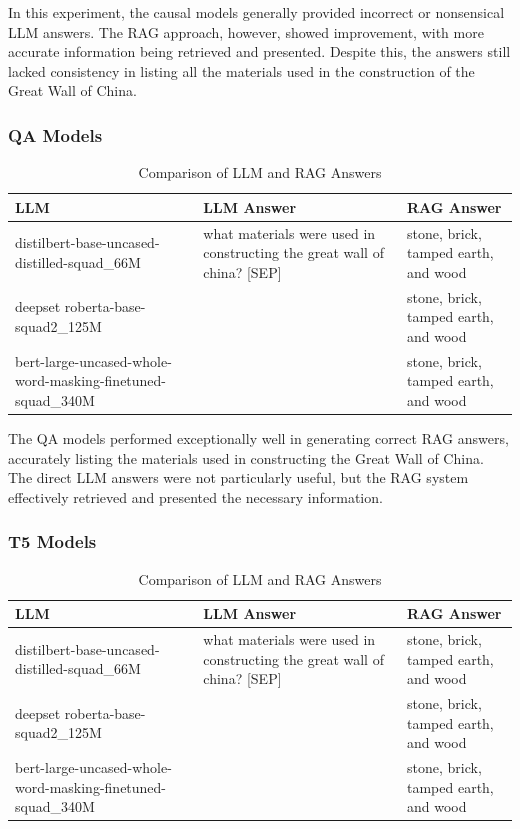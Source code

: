 \documentclass{wseas}
\begin{document}
In this experiment, the causal models generally provided incorrect or
nonsensical LLM answers. The RAG approach, however, showed improvement,
with more accurate information being retrieved and presented. Despite
this, the answers still lacked consistency in listing all the materials
used in the construction of the Great Wall of China.

\subsubsection{QA Models}

\begin{table}[htbp]
\centering
\caption{Comparison of LLM and RAG Answers} %
\begin{tabular}{p{0.3714\linewidth} p{0.4000\linewidth} p{0.2286\linewidth}}
\toprule
\textbf{LLM} & \textbf{LLM Answer} & \textbf{RAG Answer} \\
\midrule
distilbert-base-uncased-distilled-squad\_66M & what materials were used in constructing the great wall of china? {[}SEP{]} & stone, brick, tamped earth, and wood \\
deepset roberta-base-squad2\_125M & & stone, brick, tamped earth, and wood \\
bert-large-uncased-whole-word-masking-finetuned-squad\_340M & & stone, brick, tamped earth, and wood \\
\bottomrule
\end{tabular}
\end{table}
  

The QA models performed exceptionally well in generating correct RAG
answers, accurately listing the materials used in constructing the Great
Wall of China. The direct LLM answers were not particularly useful, but
the RAG system effectively retrieved and presented the necessary
information.

\subsubsection{T5 Models}

\begin{table}[htbp]
\centering
\caption{Comparison of LLM and RAG Answers} %
\begin{tabular}{p{0.3714\linewidth} p{0.4000\linewidth} p{0.2286\linewidth}}
\toprule
\textbf{LLM} & \textbf{LLM Answer} & \textbf{RAG Answer} \\
\midrule
distilbert-base-uncased-distilled-squad\_66M & what materials were used in constructing the great wall of china? {[}SEP{]} & stone, brick, tamped earth, and wood \\
deepset roberta-base-squad2\_125M & & stone, brick, tamped earth, and wood \\
bert-large-uncased-whole-word-masking-finetuned-squad\_340M & & stone, brick, tamped earth, and wood \\
\bottomrule
\end{tabular}
\end{table}
\end{document}
